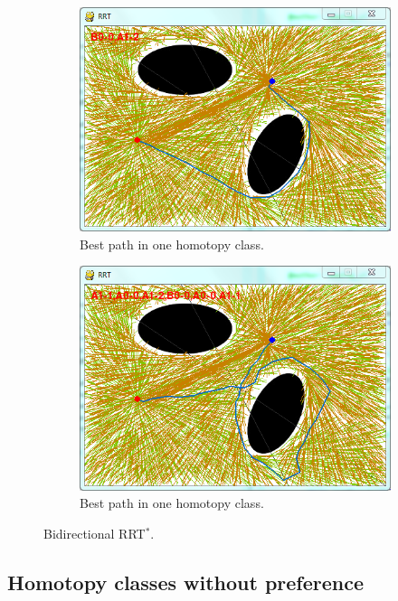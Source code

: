 \documentclass[letterpaper, 10 pt, conference]{ieeeconf}
\begin{document}
\begin{figure}
\begin{subfigure}[t]{0.47\linewidth}
		\centering
		\includegraphics[width=\textwidth]{fig/all_homotopy3.png}
		\caption{Best path in one homotopy class.}
		\label{fig:all_homotopy:03}
	\end{subfigure}  
	\begin{subfigure}[t]{0.47\linewidth}
		\centering
		\includegraphics[width=\textwidth]{fig/all_homotopy4.png}
		\caption{Best path in one homotopy class.}
		\label{fig:all_homotopy:all_scores}
	\end{subfigure}	   
	\caption{Bidirectional RRT$^{*}$.}
	\label{fig:all_homotopy:no_pref}
\end{figure}

\subsection{Homotopy classes without preference}
\end{document}
